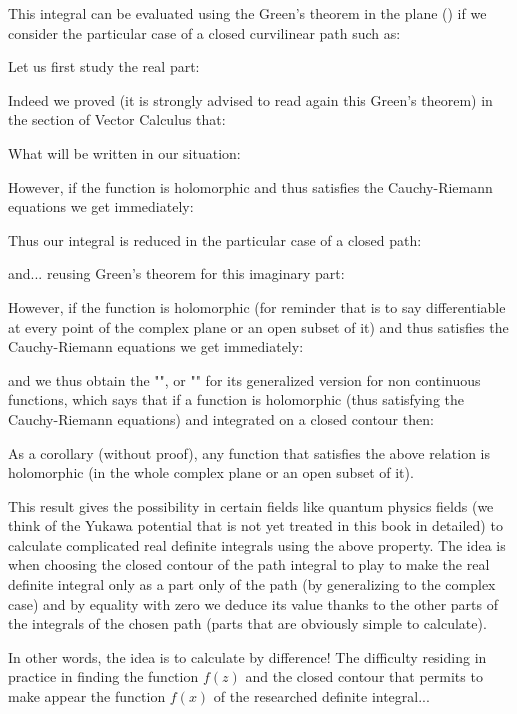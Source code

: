 	This integral can be evaluated using the Green's theorem in the plane () if we consider the particular case of a closed curvilinear path such as:
	
	Let us first study the real part:
	
	Indeed we proved (it is strongly advised to read again this Green's theorem) in the section of Vector Calculus that:
	
	What will be written in our situation:
	
	However, if the function is holomorphic and thus satisfies the Cauchy-Riemann equations we get immediately:
	
	Thus our integral is reduced in the particular case of a closed path:
	
	and... reusing Green's theorem for this imaginary part:
	
	However, if the function is holomorphic (for reminder that is to say differentiable at every point of the complex plane or an open subset of it) and thus satisfies the Cauchy-Riemann equations we get immediately:
	
	and we thus obtain the "", or "" for its generalized version for non continuous functions, which says that if a function is holomorphic (thus satisfying the Cauchy-Riemann equations) and integrated on a closed contour then:
	
	As a corollary (without proof), any function that satisfies the above relation is holomorphic (in the whole complex plane or an open subset of it).
	
	This result gives the possibility in certain fields like quantum physics fields (we think of the Yukawa potential that is not yet treated in this book in detailed) to calculate complicated real definite integrals using the above property. The idea is when choosing the closed contour of the path integral to play to make the real definite integral only as a part only of the path (by generalizing to the complex case) and by equality with zero we deduce its value thanks to the other parts of the integrals of the chosen path (parts that are obviously simple to calculate).
	
	In other words, the idea is to calculate by difference! The difficulty residing in practice in finding the function $f (z)$ and the closed contour that permits to make appear the function $f (x) $ of the researched definite integral...
	
